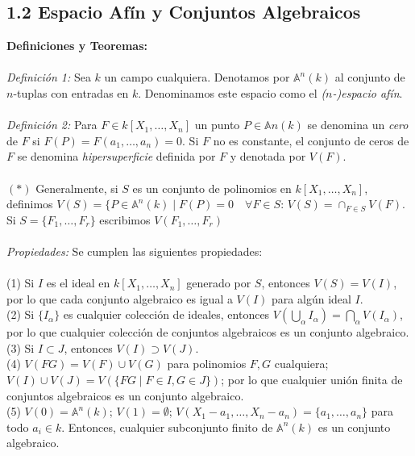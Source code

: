 \documentclass{article}
\newcommand{\A}{\mathbb{A}}
\begin{document}
\subsection*{1.2 Espacio Afín y Conjuntos Algebraicos}
\textbf{Definiciones y Teoremas:}
\\
\\
\textit{Definición 1:} Sea $k$ un campo cualquiera. Denotamos por $\A^{n}(k)$ al conjunto de $n$-tuplas con entradas en $k$. Denominamos este espacio como el \textit{($n$-)espacio afín}.
\\
\\
\textit{Definición 2:} Para $F \in k[X_1 , \dots, X_n]$ un punto $P \in \A{n}(k)$ se denomina un \textit{cero} de $F$ si $F(P)=F(a_1 , \dots , a_n)=0$. Si $F$ no es constante, el conjunto de ceros de $F$ se denomina \textit{hipersuperficie} definida por $F$ y denotada por $V(F)$.
\\
\\
$(*)$ Generalmente, si $S$ es  un conjunto de polinomios en $k[X_1 , \dots , X_n]$, definimos $V(S)= \{P \in \A^{n}(k) \mid F(P)=0 \quad \forall F \in S$: $V(S)= \cap_{F \in S} V(F)$. Si $S= \{F_1, \dots, F_r \}$ escribimos $V(F_1 , \dots, F_r)$
\\
\\
\textit{Propiedades:} Se cumplen las siguientes propiedades:
\\
\\
(1) Si $I$ es el ideal en $k[X_1, \dots, X_n]$ generado por $S$, entonces $V(S)=V(I)$, por lo que cada conjunto algebraico es igual a $V(I)$ para algún ideal $I$.
\\
(2) Si $\{I_{\alpha} \}$ es cualquier colección de ideales, entonces $V(\bigcup_{\alpha} I_{\alpha})= \bigcap_{\alpha} V(I_{\alpha})$, por lo que cualquier colección de conjuntos algebraicos es un conjunto algebraico.
\\
(3) Si $I \subset J$, entonces $V(I) \supset V(J)$.
\\
(4) $V(FG)=V(F) \cup V(G)$ para polinomios $F,G$ cualquiera; $V(I) \cup V(J)=V( \{FG \mid F \in I, G \in J \})$; por lo que cualquier unión finita de conjuntos algebraicos es un conjunto algebraico.
\\
(5) $V(0)=\A^{n}(k)$; $V(1)=\emptyset$; $V(X_1 - a_1, \dots, X_n -a_n)=\{a_1, \dots,a_n \}$ para todo $a_i \in k$. Entonces, cualquier subconjunto finito de $\A^{n}(k)$ es un conjunto algebraico.
\end{document}
